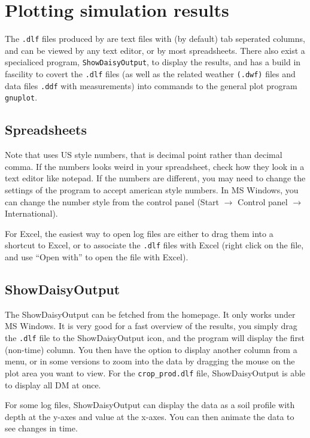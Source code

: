 \documentclass[a4paper,11pt]{article}
\begin{document}
\section{Plotting simulation results}
\label{sec:plot}

The \texttt{.dlf} files produced by \daisy{} are text files with (by
default) tab seperated columns, and can be viewed by any text editor,
or by most spreadsheets.  There also exist a specialiced program,
\texttt{ShowDaisyOutput}, to display the results, and \Daisy{} has a
build in fascility to covert the \texttt{.dlf} files (as well as the
related weather \texttt{(.dwf)} files and data files \texttt{.ddf}
with measurements) into commands to the general plot program
\texttt{gnuplot}. 


\subsection{Spreadsheets}

Note that \daisy{} uses US style numbers, that is decimal point rather
than decimal comma.  If the numbers looks weird in your spreadsheet,
check how they look in a text editor like notepad.  If the numbers are
different, you may need to change the settings of the program to
accept american style numbers.  In MS Windows, you can change the
number style from the control panel (Start $\rightarrow$ Control panel
$\rightarrow$ International).

For Excel, the easiest way to open \daisy{} log files are either to
drag them into a shortcut to Excel, or to associate the \texttt{.dlf}
files with Excel (right click on the file, and use ``Open with'' to
open the file with Excel).

\subsection{ShowDaisyOutput}

The ShowDaisyOutput can be fetched from the \daisy{} homepage.  It
only works under MS Windows.  It is very good for a fast overview of
the results, you simply drag the \texttt{.dlf} file to the
ShowDaisyOutput icon, and the program will display the first
(non-time) column.  You then have the option to display another column
from a menu, or in some versions to zoom into the data by dragging the
mouse on the plot area you want to view.  For the
\texttt{crop\_prod.dlf} file, ShowDaisyOutput is able to display all
DM at once.

For some log files, ShowDaisyOutput can display the data as a soil
profile with depth at the y-axes and value at the x-axes.  You can
then animate the data to see changes in time.
\end{document}
